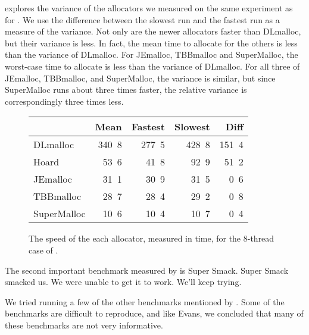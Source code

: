 \documentclass[pldi]{sigplanconf-pldi15}
\newcommand{\ns}[1]{\unit{#1}\nano\second{}}
\begin{document}
 explores the variance of the allocators we measured
on the same experiment as for .  We use the difference
between the slowest run and the fastest run as a measure of the
variance.  Not only are the newer allocators faster than DLmalloc, but
their variance is less.  In fact, the mean time to allocate for the
others is less than the variance of DLmalloc. For JEmalloc, TBBmalloc
and SuperMalloc, the worst-case time to allocate is less than the
variance of DLmalloc.  For all three of JEmalloc, TBBmalloc, and
SuperMalloc, the variance is similar, but since SuperMalloc runs about
three times faster, the relative variance is correspondingly three
times less.

\begin{figure}
\begin{center}
\begin{tabular}{l@{}rrrr}
            & Mean       & Fastest    & Slowest     & Diff       \\ \hline
DLmalloc    & \ns{340.8} & \ns{277.5} & \ns{428.8}  & \ns{151.4} \\
Hoard       & \ns{ 53.6} & \ns{ 41.8} & \ns{ 92.9}  & \ns{ 51.2} \\
JEmalloc    & \ns{ 31.1} & \ns{ 30.9} & \ns{ 31.5}  & \ns{  0.6} \\
TBBmalloc   & \ns{ 28.7} & \ns{ 28.4} & \ns{ 29.2}  & \ns{  0.8} \\
SuperMalloc & \ns{ 10.6} & \ns{ 10.4} & \ns{ 10.7}  & \ns{  0.4} \\
\end{tabular}
\end{center}
\caption{The speed of the each allocator, measured in time, for the
  8-thread case of .  }
\label{fig:variance}
\end{figure}

The second important benchmark measured by \cite{Evans06} is Super
Smack.  Super Smack smacked us.  We were unable to get it to work.
We'll keep trying.

We tried running a few of the other benchmarks mentioned by
\cite{Evans06}.  Some of the benchmarks are difficult to reproduce,
and like Evans, we concluded that many of these benchmarks are not
very informative.
\end{document}
